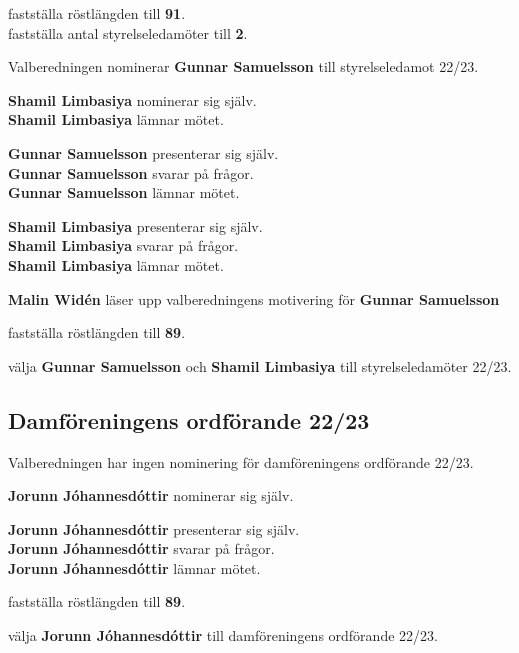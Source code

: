 \documentclass[../protokoll_vintermote_2022.tex]{subfiles}
\begin{document}
\motetbeslutar\att{} fastställa röstlängden till \textbf{91}. \\
\motetbeslutar\att{} fastställa antal styrelseledamöter till \textbf{2}.


Valberedningen nominerar \textbf{Gunnar Samuelsson} till styrelseledamot 22/23. 

\textbf{Shamil Limbasiya} nominerar sig själv.\\
\textbf{Shamil Limbasiya} lämnar mötet.

\textbf{Gunnar Samuelsson} presenterar sig själv. \\
\textbf{Gunnar Samuelsson} svarar på frågor. \\
\textbf{Gunnar Samuelsson} lämnar mötet.

\textbf{Shamil Limbasiya} presenterar sig själv. \\
\textbf{Shamil Limbasiya} svarar på frågor. \\
\textbf{Shamil Limbasiya} lämnar mötet.

\textbf{Malin Widén} läser upp valberedningens motivering för \textbf{Gunnar Samuelsson}

\motetbeslutar\att{} fastställa röstlängden till \textbf{89}.

\motetbeslutar
\att{} välja \textbf{Gunnar Samuelsson} och \textbf{Shamil Limbasiya} till styrelseledamöter 22/23.













\subsection{Damföreningens ordförande 22/23}
Valberedningen har ingen nominering för damföreningens ordförande 22/23.

\textbf{Jorunn Jóhannesdóttir} nominerar sig själv.

\textbf{Jorunn Jóhannesdóttir} presenterar sig själv.\\
\textbf{Jorunn Jóhannesdóttir} svarar på frågor.\\
\textbf{Jorunn Jóhannesdóttir} lämnar mötet.


\motetbeslutar\att{} fastställa röstlängden till \textbf{89}.

\motetbeslutar
\att{} välja \textbf{Jorunn Jóhannesdóttir} till damföreningens ordförande 22/23.
\end{document}
